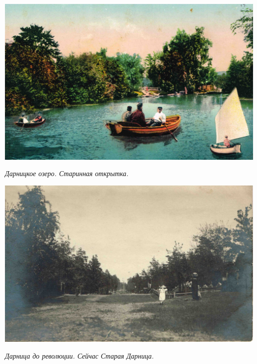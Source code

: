 \begin{center}
\includegraphics[width=\linewidth]{lpix/darn.jpg}

\textit{Дарницкое озеро. Старинная открытка.}
\end{center}

\vspace*{\fill}

\newpage

\vspace*{\fill}

\begin{center}
\includegraphics[width=\linewidth]{lpix/darn01.jpg}

\textit{Дарница до революции. Сейчас Старая Дарница.}
\end{center}


